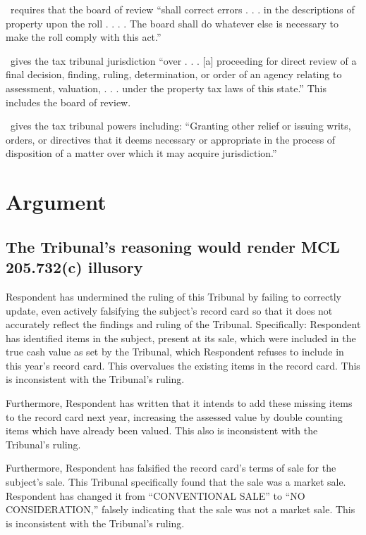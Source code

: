 \documentclass[12pt,\documentclassflag]{michiganCourtOfAppealsBrief}
\begin{document}
\cite{MCL 211.29(2)}\ requires that the board of review ``shall correct errors . . . in the descriptions of property upon the roll . . . . The board shall do whatever else is necessary to make the roll comply with this act.''

\cite{MCL 205.731}\ gives the tax tribunal jurisdiction ``over . . . [a] proceeding for direct review of a final decision, finding, ruling, determination, or order of an agency relating to assessment, valuation, . . .
under the property tax laws of this state.'' This includes the board of review.

\cite{MCL 205.732(c)}\ gives the tax tribunal powers including: ``Granting other relief or issuing writs, orders, or directives that it deems necessary or appropriate in the process of disposition of a matter over which it may acquire jurisdiction.'' 

\section{Argument}

\subsection{The Tribunal's reasoning would render MCL 205.732(c) illusory}

Respondent has undermined the ruling of this Tribunal by failing to correctly update, even actively falsifying the subject's record card so that it does not accurately reflect the findings and ruling of the Tribunal. Specifically: Respondent has identified items in the subject, present at its sale, which were included in the true cash value as set by the Tribunal, which Respondent refuses to include in this year's record card. This overvalues the existing items in the record card. This is inconsistent with the Tribunal's ruling.

Furthermore, Respondent has written that it intends to add these missing items to the record card next year, increasing the assessed value by double counting items which have already been valued. This also is inconsistent with the Tribunal's ruling.

Furthermore, Respondent has falsified the record card's terms of sale for the subject's sale. This Tribunal specifically found that the sale was a market sale. Respondent has changed it from ``CONVENTIONAL SALE'' to ``NO CONSIDERATION,'' falsely indicating that the sale was not a market sale. This is inconsistent with the Tribunal's ruling.
\end{document}
